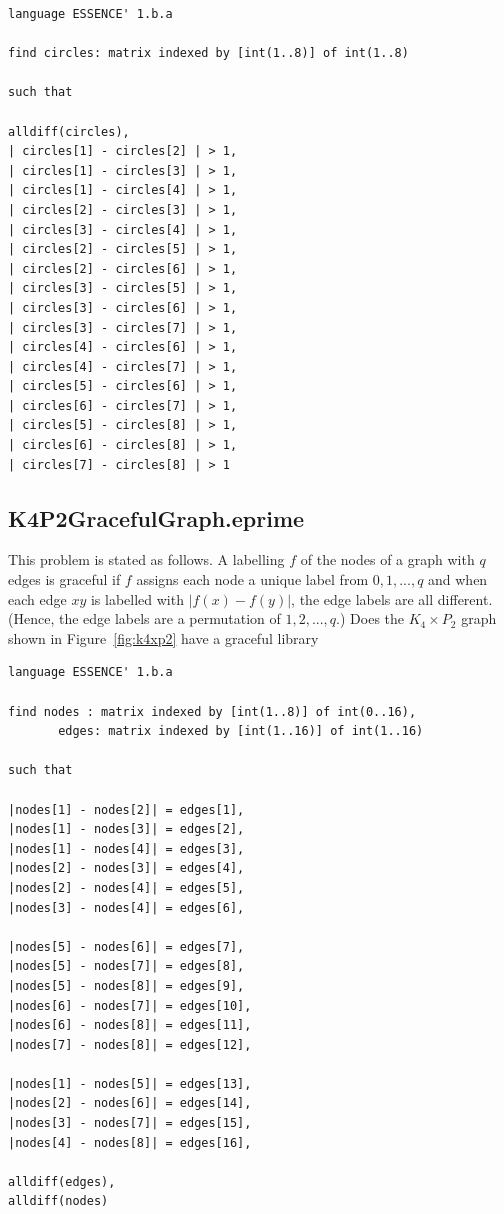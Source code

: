 \documentclass[oneside]{book}
\begin{document}
\begin{verbatim}
language ESSENCE' 1.b.a

find circles: matrix indexed by [int(1..8)] of int(1..8)

such that

alldiff(circles),
| circles[1] - circles[2] | > 1,
| circles[1] - circles[3] | > 1,
| circles[1] - circles[4] | > 1,
| circles[2] - circles[3] | > 1,
| circles[3] - circles[4] | > 1,
| circles[2] - circles[5] | > 1,
| circles[2] - circles[6] | > 1,
| circles[3] - circles[5] | > 1,
| circles[3] - circles[6] | > 1,
| circles[3] - circles[7] | > 1,
| circles[4] - circles[6] | > 1,
| circles[4] - circles[7] | > 1,
| circles[5] - circles[6] | > 1,
| circles[6] - circles[7] | > 1,
| circles[5] - circles[8] | > 1,
| circles[6] - circles[8] | > 1,
| circles[7] - circles[8] | > 1
\end{verbatim}

\subsection{K4P2GracefulGraph.eprime}\label{sect:graceful}
This problem is stated as follows. A labelling $f$ of the nodes of a graph with $q$ edges is graceful if $f$ assigns each node a unique label from $0,1,..., q$ and when each edge $xy$ is labelled with $|f(x) - f(y)|$, the edge labels are all different. (Hence, the edge labels are a permutation of $1, 2, ..., q$.) Does the $K_4 \times P_2$ graph shown in Figure~\ref{fig:k4xp2} have a graceful library
\begin{verbatim}
language ESSENCE' 1.b.a

find nodes : matrix indexed by [int(1..8)] of int(0..16),
       edges: matrix indexed by [int(1..16)] of int(1..16)

such that

|nodes[1] - nodes[2]| = edges[1],
|nodes[1] - nodes[3]| = edges[2],
|nodes[1] - nodes[4]| = edges[3],
|nodes[2] - nodes[3]| = edges[4],
|nodes[2] - nodes[4]| = edges[5],
|nodes[3] - nodes[4]| = edges[6],

|nodes[5] - nodes[6]| = edges[7],
|nodes[5] - nodes[7]| = edges[8],
|nodes[5] - nodes[8]| = edges[9],
|nodes[6] - nodes[7]| = edges[10],
|nodes[6] - nodes[8]| = edges[11],
|nodes[7] - nodes[8]| = edges[12],

|nodes[1] - nodes[5]| = edges[13],
|nodes[2] - nodes[6]| = edges[14],
|nodes[3] - nodes[7]| = edges[15],
|nodes[4] - nodes[8]| = edges[16],

alldiff(edges),
alldiff(nodes)
\end{verbatim}
\end{document}
